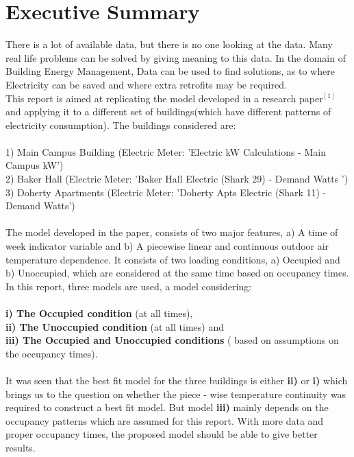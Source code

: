 \documentclass[a4paper,11pt]{article}
\begin{document}
\section{Executive Summary}
There is a lot of available data, but there is no one looking at the data. Many real life problems can be solved by giving meaning to this data. In the domain of Building Energy Management, Data can be used to find solutions, as to where Electricity can be saved and where extra retrofits may be required.\\
This report is aimed at replicating the model developed in a research paper$^{[1]}$ and applying it to a different set of buildings(which have different patterns of electricity consumption).
The buildings considered are:\\\\
1) Main Campus Building (Electric Meter: 'Electric kW Calculations - Main Campus kW')\\
2) Baker Hall (Electric Meter: 'Baker Hall Electric (Shark 29) - Demand Watts ') \\
3) Doherty Apartments (Electric Meter: 'Doherty Apts Electric (Shark 11) - Demand Watts')\\\\
The model developed in the paper, consists of two major features, a) A time of week indicator variable and b) A piecewise linear and continuous outdoor air temperature dependence. It consists of two loading conditions, a) Occupied and b) Unoccupied, which are considered at the same time based on occupancy times.\\ In this report, three models are used, a model considering:\\\\ \textbf{i) The Occupied condition} (at all times),\\ \textbf{ii) The Unoccupied condition} (at all times) and\\ \textbf{iii) The Occupied and Unoccupied conditions} ( based on assumptions on the occupancy times).\\\\
It was seen that the best fit model for the three buildings is either \textbf{ii)} or \textbf{i)} which brings us to the question on whether the piece - wise temperature continuity was required to construct a best fit model. But model \textbf{iii)} mainly depends on the occupancy patterns which are assumed for this report. With more data and proper occupancy times, the proposed model should be able to give better results.   
\end{document}

